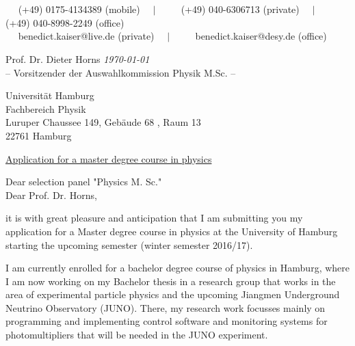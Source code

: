 \documentclass[11 pt, a4paper]{MyCV}
\makeatletter
\newcommand{\mobilePhone}{\textcolor{darkCerulean}\faMobile ~~ (+49) 0175-4134389 (mobile)}
\newcommand{\privatePhone}{\textcolor{darkCerulean}\faPhone ~~ (+49) 040-6306713 (private)}
\newcommand{\officePhone}{\textcolor{darkCerulean}\faPhoneSquare ~~ (+49) 040-8998-2249 (office)}
\newcommand{\privateMail}{\textcolor{darkCerulean}\faEnvelope ~~ benedict.kaiser@live.de (private)}
\newcommand{\officeMail}{\textcolor{darkCerulean}\faEnvelopeSquare ~~ benedict.kaiser@desy.de (office)}
\newcommand{\separator}{~~ $\mid$ ~~}
\makeatother
\begin{document}

\begin{center}
	\begingroup
		\HUGE
		 
	\endgroup
	\\
	\begin{footnotesize}
	\end{footnotesize}
	\\[0.5em]
	\begin{scriptsize}
		\mobilePhone \separator \privatePhone \separator \officePhone\\
		\privateMail \separator \officeMail
	\end{scriptsize}
\end{center}

\vspace*{2cm}



\begingroup
	\bodyfont
	Prof. Dr. Dieter Horns \hfill \textit{\themainfont\today} \\
	– Vorsitzender der Auswahlkommission Physik M.Sc. –
\endgroup

Universität Hamburg\\
Fachbereich Physik\\
Luruper Chaussee 149, Gebäude 68 , Raum 13\\
22761 Hamburg\\

\vspace*{0.75cm}


\begingroup
	\bodyfont
	\underline{Application for a master degree course in physics}
\endgroup


Dear selection panel "Physics M. Sc."\\
Dear Prof. Dr. Horns,

it is with great pleasure and anticipation that I am submitting you my application for a Master degree course in physics at the University of Hamburg starting the upcoming semester (winter semester 2016/17).

I am currently enrolled for a bachelor degree course of physics in Hamburg, where I am now working on my Bachelor thesis in a research group that works in the area of experimental particle physics and the upcoming Jiangmen Underground Neutrino Observatory (JUNO). There, my research work focusses mainly on programming and implementing control software and monitoring systems for photomultipliers that will be needed in the JUNO experiment.
\end{document}
